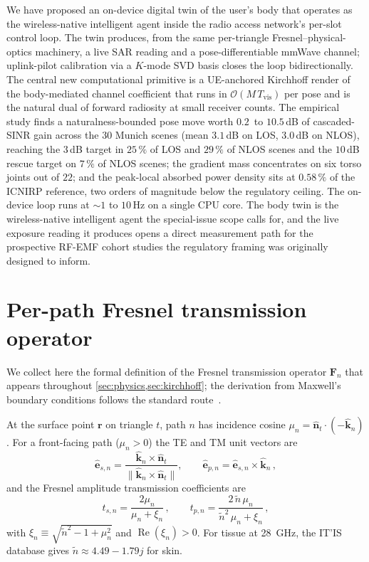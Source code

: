 \documentclass[journal,twocolumn,10pt]{IEEEtran}
\theoremstyle{plain}
\theoremstyle{definition}
\theoremstyle{remark}
\newcommand{\Fn}{\mathbf{F}_n}
\newcommand{\ntilde}{\tilde{n}}
\DeclareMathOperator{\RE}{Re}
\begin{document}
We have proposed an on-device digital twin of the user's body that
operates as the wireless-native intelligent agent inside the radio
access network's per-slot control loop. The twin produces, from the
same per-triangle Fresnel--physical-optics machinery, a live SAR
reading and a pose-differentiable mmWave channel; uplink-pilot
calibration via a $K$-mode SVD basis closes the loop bidirectionally.
The central new computational primitive is a UE-anchored Kirchhoff
render of the body-mediated channel coefficient that runs in
$\mathcal{O}(M\,T_{\mathrm{vis}})$ per pose and is the natural dual
of forward radiosity at small receiver counts. The empirical
study finds a naturalness-bounded pose move worth $0.2$~to
$10.5\,$dB of cascaded-SINR gain across the $30$ Munich scenes
(mean $3.1\,$dB on LOS, $3.0\,$dB on NLOS), reaching the
$3\,$dB target in $25\,\%$ of LOS and $29\,\%$ of NLOS scenes
and the $10\,$dB rescue target on $7\,\%$ of NLOS scenes;
the gradient mass concentrates on six torso joints out of $22$;
and the peak-local absorbed power density sits at $0.58\,\%$ of
the ICNIRP reference, two orders of magnitude below the regulatory
ceiling. The on-device loop runs
at $\sim\!1$ to $10\,$Hz on a single CPU core. The body twin is
the wireless-native intelligent agent the special-issue scope
calls for, and the live exposure reading it produces opens a
direct measurement path for the prospective RF-EMF cohort
studies the regulatory framing was originally designed to inform.


\appendices
\section{Per-path Fresnel transmission operator}\label{app:fresnel}

We collect here the formal definition of the Fresnel transmission
operator $\Fn$ that appears throughout
\cref{sec:physics,sec:kirchhoff}; the derivation from Maxwell's
boundary conditions follows the standard route~\cite{BornWolf}.

At the surface point $\bm{r}$ on triangle $t$, path $n$ has
incidence cosine $\mu_n = \hat{\bm{n}}_t \cdot (-\hat{\bm{k}}_n)$.
For a front-facing path ($\mu_n > 0$) the TE and TM unit vectors are
\begin{equation}\label{eq:TE-TM-basis}
  \hat{\bm{e}}_{s,n} = \frac{\hat{\bm{k}}_n \times \hat{\bm{n}}_t}
                            {\|\hat{\bm{k}}_n \times \hat{\bm{n}}_t\|},
  \qquad
  \hat{\bm{e}}_{p,n} = \hat{\bm{e}}_{s,n} \times \hat{\bm{k}}_n\,,
\end{equation}
and the Fresnel amplitude transmission coefficients are
\begin{equation}\label{eq:fresnel-t}
  t_{s,n} = \frac{2\mu_n}{\mu_n + \xi_n}\,, \qquad
  t_{p,n} = \frac{2\,\ntilde\,\mu_n}{\ntilde^2\,\mu_n + \xi_n}\,,
\end{equation}
with $\xi_n \equiv \sqrt{\ntilde^2 - 1 + \mu_n^2}$ and
$\RE(\xi_n) > 0$. For tissue at 28~GHz, the IT'IS database gives
$\ntilde \approx 4.49 - 1.79j$ for skin.
\end{document}
